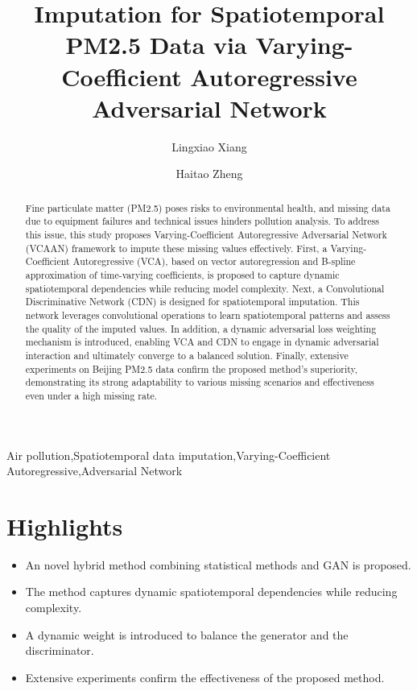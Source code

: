 \documentclass[3p,11pt,authoryear]{elsarticle}
\begin{document}
\begin{frontmatter}
\title{Imputation for Spatiotemporal PM2.5 Data via Varying-Coefficient Autoregressive Adversarial Network}

\author[1]{Lingxiao Xiang}
\author[1]{Haitao Zheng }

\begin{abstract}
	Fine particulate matter (PM2.5) poses risks to environmental health, and missing data due to equipment failures and technical issues hinders pollution analysis. To address this issue, this study proposes Varying-Coefficient Autoregressive Adversarial Network (VCAAN) framework to impute these missing values effectively. First, a Varying-Coefficient Autoregressive (VCA), based on vector autoregression and B-spline approximation of time-varying coefficients, is proposed to capture dynamic spatiotemporal dependencies while reducing model complexity. Next, a Convolutional Discriminative Network (CDN) is designed for spatiotemporal imputation. This network leverages convolutional operations to learn spatiotemporal patterns and assess the quality of the imputed values. In addition, a dynamic adversarial loss weighting mechanism is introduced, enabling VCA and CDN to engage in dynamic adversarial interaction and ultimately converge to a balanced solution. Finally, extensive experiments on Beijing PM2.5 data confirm the proposed method's superiority, demonstrating its strong adaptability to various missing scenarios and effectiveness even under a high missing rate.
\end{abstract}


\begin{keyword}
	Air pollution\sep  Spatiotemporal data imputation\sep Varying-Coefficient Autoregressive\sep Adversarial Network
\end{keyword}

\end{frontmatter}

\section*{Highlights}
\begin{itemize}
	\item An novel hybrid method combining statistical methods and GAN is proposed. 
	\item The method captures dynamic spatiotemporal dependencies while reducing complexity. 
	\item A dynamic weight is introduced to balance the generator and the discriminator. 
	\item Extensive experiments confirm the effectiveness of the proposed method. 
\end{itemize}
\end{document}

